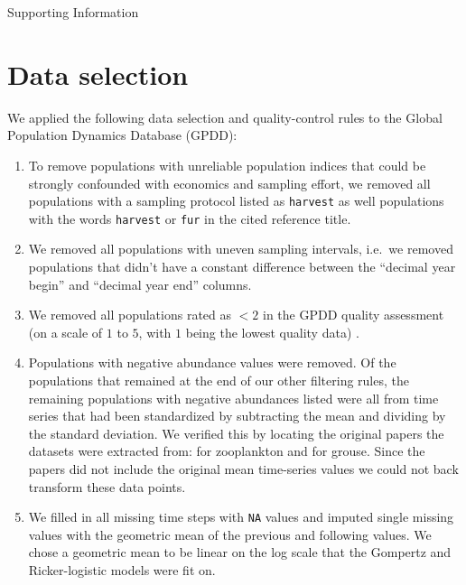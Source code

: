 
\begin{centering}
\LARGE
Supporting Information\\[1.0em]
\end{centering}

\section{Data selection}

We applied the following data selection and quality-control rules to the Global Population Dynamics Database (GPDD):

\begin{enumerate}

\item To remove populations with unreliable population indices that could be strongly confounded with economics and sampling effort, we removed all populations with a sampling protocol listed as \texttt{harvest} as well populations with the words \texttt{harvest} or \texttt{fur} in the cited reference title.

\item We removed all populations with uneven sampling intervals, i.e.\ we removed populations that didn't have a constant difference between the ``decimal year begin'' and ``decimal year end'' columns.

\item We removed all populations rated as $< 2$ in the GPDD quality assessment (on a scale of $1$ to $5$, with $1$ being the lowest quality data) \citep[following][]{sibly2005, ziebarth2010}.

\item Populations with negative abundance values were removed. Of the populations that remained at the end of our other filtering rules, the remaining populations with negative abundances listed were all from time series that had been standardized by subtracting the mean and dividing by the standard deviation. We verified this by locating the original papers the datasets were extracted from: \citet{colebrook1978} for zooplankton and \citet{lindstrom1995} for grouse. Since the papers did not include the original mean time-series values we could not back transform these data points.

\item We filled in all missing time steps with \texttt{NA} values and imputed single missing values with the geometric mean of the previous and following values. We chose a geometric mean to be linear on the log scale that the Gompertz and Ricker-logistic models were fit on.


\end{enumerate}
